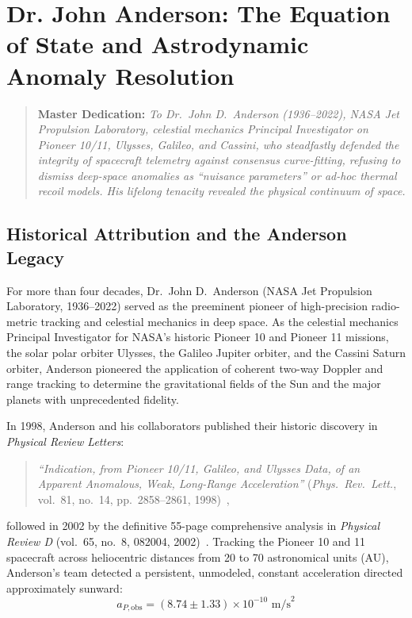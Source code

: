 \documentclass[11pt,a4paper]{article}
\begin{document}

\section{Dr. John Anderson: The Equation of State and Astrodynamic Anomaly Resolution}
\label{sec:anderson_equation}

\begin{quote}
\centering
\textbf{Master Dedication:} \textit{To Dr.~John D.~Anderson (1936--2022), NASA Jet Propulsion Laboratory, celestial mechanics Principal Investigator on Pioneer 10/11, Ulysses, Galileo, and Cassini, who steadfastly defended the integrity of spacecraft telemetry against consensus curve-fitting, refusing to dismiss deep-space anomalies as ``nuisance parameters'' or ad-hoc thermal recoil models. His lifelong tenacity revealed the physical continuum of space.}
\end{quote}

\subsection{Historical Attribution and the Anderson Legacy}
\label{subsec:anderson_historical}

For more than four decades, Dr.~John D.~Anderson (NASA Jet Propulsion Laboratory, 1936--2022) served as the preeminent pioneer of high-precision radio-metric tracking and celestial mechanics in deep space. As the celestial mechanics Principal Investigator for NASA's historic Pioneer 10 and Pioneer 11 missions, the solar polar orbiter Ulysses, the Galileo Jupiter orbiter, and the Cassini Saturn orbiter, Anderson pioneered the application of coherent two-way Doppler and range tracking to determine the gravitational fields of the Sun and the major planets with unprecedented fidelity.

In 1998, Anderson and his collaborators published their historic discovery in \textit{Physical Review Letters}:
\begin{quote}
\textit{``Indication, from Pioneer 10/11, Galileo, and Ulysses Data, of an Apparent Anomalous, Weak, Long-Range Acceleration''} (\textit{Phys.~Rev.~Lett.}, vol.~81, no.~14, pp.~2858--2861, 1998)~\cite{Anderson1998},
\end{quote}
followed in 2002 by the definitive 55-page comprehensive analysis in \textit{Physical Review D} (vol.~65, no.~8, 082004, 2002)~\cite{Anderson2002}. Tracking the Pioneer 10 and 11 spacecraft across heliocentric distances from 20 to 70 astronomical units (AU), Anderson's team detected a persistent, unmodeled, constant acceleration directed approximately sunward:
\begin{equation}
a_{P,\text{obs}} = (8.74 \pm 1.33) \times 10^{-10}\text{ m/s}^2
\label{eq:pioneer_observed}
\end{equation}
\end{document}
